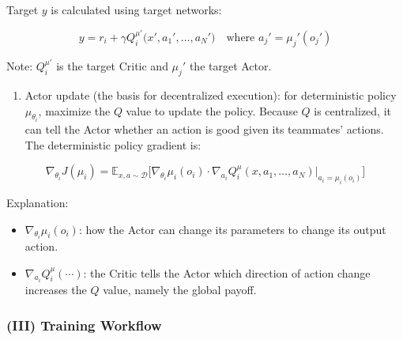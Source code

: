 Target \(y\) is calculated using target networks:

\[
y
=
r_i
+
\gamma
Q_i^{\mu'}\bigl(
x',
a_1',
\ldots,
a_N'
\bigr)
\quad
\text{where }
a_j'=\mu_j'(o_j')
\]

Note: \(Q_i^{\mu'}\) is the target Critic and \(\mu_j'\) the target Actor.

\begin{enumerate}
\def\labelenumi{\arabic{enumi}.}
\setcounter{enumi}{1}
\tightlist
\item
  Actor update (the basis for decentralized execution): for deterministic policy \(\mu_{\theta_i}\), maximize the \(Q\) value to update the policy. Because \(Q\) is centralized, it can tell the Actor whether an action is good given its teammates' actions. The deterministic policy gradient is:
\end{enumerate}

\[
\nabla_{\theta_i}J(\mu_i)
=
\mathbb{E}_{x,a\sim\mathcal{D}}
\bigl[
\nabla_{\theta_i}\mu_i(o_i)
\cdot
\nabla_{a_i}Q_i^{\mu}(x,a_1,\ldots,a_N)
\big|_{a_i=\mu_i(o_i)}
\bigr]
\]

Explanation:

\begin{itemize}
\tightlist
\item
  \(\nabla_{\theta_i}\mu_i(o_i)\): how the Actor can change its parameters to change its output action.
\item
  \(\nabla_{a_i}Q_i^{\mu}(\cdots)\): the Critic tells the Actor which direction of action change increases the \(Q\) value, namely the global payoff.
\end{itemize}

\hypertarget{iii-training-workflow}{%
\subsubsection{(III) Training Workflow}\label{iii-training-workflow}}

